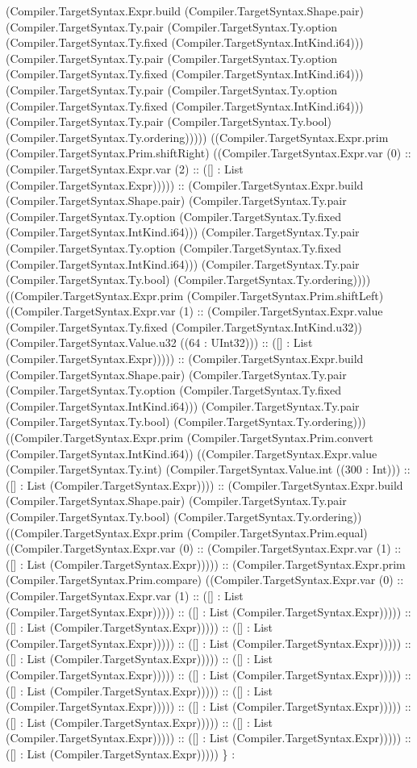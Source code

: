 \documentclass[11pt]{article}
\begin{document}
(Compiler.TargetSyntax.Expr.build (Compiler.TargetSyntax.Shape.pair) (Compiler.TargetSyntax.Ty.pair (Compiler.TargetSyntax.Ty.option (Compiler.TargetSyntax.Ty.fixed (Compiler.TargetSyntax.IntKind.i64))) (Compiler.TargetSyntax.Ty.pair (Compiler.TargetSyntax.Ty.option (Compiler.TargetSyntax.Ty.fixed (Compiler.TargetSyntax.IntKind.i64))) (Compiler.TargetSyntax.Ty.pair (Compiler.TargetSyntax.Ty.option (Compiler.TargetSyntax.Ty.fixed (Compiler.TargetSyntax.IntKind.i64))) (Compiler.TargetSyntax.Ty.pair (Compiler.TargetSyntax.Ty.bool) (Compiler.TargetSyntax.Ty.ordering))))) ((Compiler.TargetSyntax.Expr.prim (Compiler.TargetSyntax.Prim.shiftRight) ((Compiler.TargetSyntax.Expr.var (0) :: (Compiler.TargetSyntax.Expr.var (2) :: ([] : List (Compiler.TargetSyntax.Expr))))) :: (Compiler.TargetSyntax.Expr.build (Compiler.TargetSyntax.Shape.pair) (Compiler.TargetSyntax.Ty.pair (Compiler.TargetSyntax.Ty.option (Compiler.TargetSyntax.Ty.fixed (Compiler.TargetSyntax.IntKind.i64))) (Compiler.TargetSyntax.Ty.pair (Compiler.TargetSyntax.Ty.option (Compiler.TargetSyntax.Ty.fixed (Compiler.TargetSyntax.IntKind.i64))) (Compiler.TargetSyntax.Ty.pair (Compiler.TargetSyntax.Ty.bool) (Compiler.TargetSyntax.Ty.ordering)))) ((Compiler.TargetSyntax.Expr.prim (Compiler.TargetSyntax.Prim.shiftLeft) ((Compiler.TargetSyntax.Expr.var (1) :: (Compiler.TargetSyntax.Expr.value (Compiler.TargetSyntax.Ty.fixed (Compiler.TargetSyntax.IntKind.u32)) (Compiler.TargetSyntax.Value.u32 ((64 : UInt32))) :: ([] : List (Compiler.TargetSyntax.Expr))))) :: (Compiler.TargetSyntax.Expr.build (Compiler.TargetSyntax.Shape.pair) (Compiler.TargetSyntax.Ty.pair (Compiler.TargetSyntax.Ty.option (Compiler.TargetSyntax.Ty.fixed (Compiler.TargetSyntax.IntKind.i64))) (Compiler.TargetSyntax.Ty.pair (Compiler.TargetSyntax.Ty.bool) (Compiler.TargetSyntax.Ty.ordering))) ((Compiler.TargetSyntax.Expr.prim (Compiler.TargetSyntax.Prim.convert (Compiler.TargetSyntax.IntKind.i64)) ((Compiler.TargetSyntax.Expr.value (Compiler.TargetSyntax.Ty.int) (Compiler.TargetSyntax.Value.int ((300 : Int))) :: ([] : List (Compiler.TargetSyntax.Expr)))) :: (Compiler.TargetSyntax.Expr.build (Compiler.TargetSyntax.Shape.pair) (Compiler.TargetSyntax.Ty.pair (Compiler.TargetSyntax.Ty.bool) (Compiler.TargetSyntax.Ty.ordering)) ((Compiler.TargetSyntax.Expr.prim (Compiler.TargetSyntax.Prim.equal) ((Compiler.TargetSyntax.Expr.var (0) :: (Compiler.TargetSyntax.Expr.var (1) :: ([] : List (Compiler.TargetSyntax.Expr))))) :: (Compiler.TargetSyntax.Expr.prim (Compiler.TargetSyntax.Prim.compare) ((Compiler.TargetSyntax.Expr.var (0) :: (Compiler.TargetSyntax.Expr.var (1) :: ([] : List (Compiler.TargetSyntax.Expr))))) :: ([] : List (Compiler.TargetSyntax.Expr))))) :: ([] : List (Compiler.TargetSyntax.Expr))))) :: ([] : List (Compiler.TargetSyntax.Expr))))) :: ([] : List (Compiler.TargetSyntax.Expr))))) :: ([] : List (Compiler.TargetSyntax.Expr))))) :: ([] : List (Compiler.TargetSyntax.Expr))))) :: ([] : List (Compiler.TargetSyntax.Expr))))) :: ([] : List (Compiler.TargetSyntax.Expr))))) :: ([] : List (Compiler.TargetSyntax.Expr))))) :: ([] : List (Compiler.TargetSyntax.Expr))))) :: ([] : List (Compiler.TargetSyntax.Expr))))) :: ([] : List (Compiler.TargetSyntax.Expr))))) :: ([] : List (Compiler.TargetSyntax.Expr))))) :: ([] : List (Compiler.TargetSyntax.Expr))))) \} : 
\end{document}
